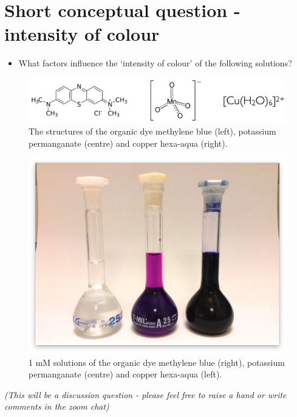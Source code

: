 \documentclass[
]{book}
\providecommand{\tightlist}{%
  \setlength{\itemsep}{0pt}\setlength{\parskip}{0pt}}
\begin{document}
\hypertarget{sec:intensity}{%
\section{Short conceptual question - intensity of colour}\label{sec:intensity}}

\begin{itemize}
\tightlist
\item
  What factors influence the `intensity of colour' of the following solutions?
\end{itemize}

\begin{figure}

{\centering \includegraphics[width=0.7\linewidth]{images/molarextquestion} 

}

\caption{The structures of the organic dye methylene blue (left), potassium permanganate (centre) and copper hexa-aqua (right).}\label{fig:molarextstructures}
\end{figure}

\begin{figure}

{\centering \includegraphics[width=0.7\linewidth]{images/Molar_extinction_coefficients} 

}

\caption{1 mM solutions of the organic dye methylene blue (right), potassium permanganate (centre) and copper hexa-aqua (left).}\label{fig:molarextsolutions}
\end{figure}

\emph{(This will be a discussion question - please feel free to raise a hand or write comments in the zoom chat)}
\end{document}
